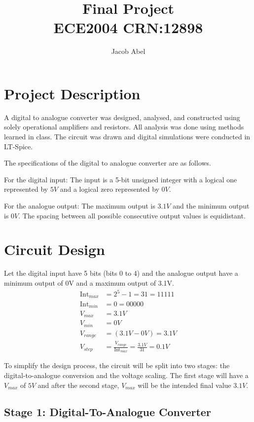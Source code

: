 \documentclass[12pt,letterpaper,titlepage]{article}
\author{Jacob Abel}
\title{	Final Project
	\\\large ECE2004 CRN:12898
}
\begin{document}
\maketitle
\begin{raggedright}

\section{Project Description}

A digital to analogue converter was designed, analysed, and constructed using solely operational amplifiers and resistors. All analysis was done using methods learned in class. The circuit was drawn and digital simulations were conducted in LT-Spice. 

The specifications of the digital to analogue converter are as follows. 

For the digital input: The input is a 5-bit unsigned integer with a logical one represented by $5V$ and a logical zero represented by $0V$.

For the analogue output: The maximum output is $3.1V$ and the minimum output is $0V$. The spacing between all possible consecutive output values is equidistant.
\clearpage
\section{Circuit Design}

Let the digital input have 5 bits (bits 0 to 4) and the analogue output have a minimum output of 0V and a maximum output of 3.1V. 
\begin{align*}
   \text{Int}_{max} &= 2^5 - 1 = 31 = 11111
\\ \text{Int}_{min} &= 0 = 00000
\\ V_{max} &= 3.1V
\\ V_{min} &= 0V
\\ V_{range} &= (3.1V - 0V) = 3.1V
\\ V_{step} &= \frac{V_{range}}{\text{Int}_{max}} = \frac{3.1V}{31} = 0.1V
\end{align*}

To simplify the design process, the circuit will be split into two stages: the digital-to-analogue conversion and the voltage scaling. The first stage
 will have a $V_{max}$ of $5V$ and after the second stage, $V_{max}$ will be the intended final value $3.1V$.

\subsection*{Stage 1: Digital-To-Analogue Converter}
 

\end{raggedright}
\end{document}
